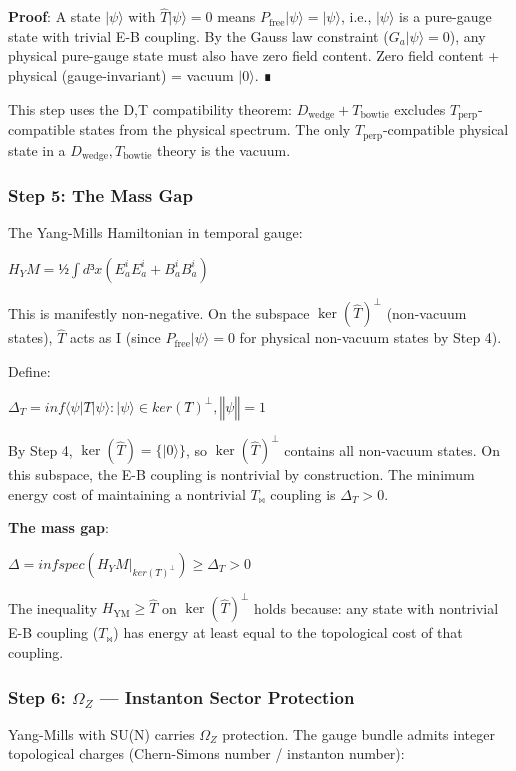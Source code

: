 \documentclass[12pt,a4paper]{article}
\begin{document}
\textbf{Proof}: A state $|\psi\rangle$ with $\hat{T}|\psi\rangle = 0$ means $P_{\text{free}}|\psi\rangle = |\psi\rangle$, i.e., $|\psi\rangle$ is a pure-gauge state with trivial E-B coupling. By the Gauss law constraint ($G_a|\psi\rangle = 0$), any physical pure-gauge state must also have zero field content. Zero field content + physical (gauge-invariant) = vacuum $|0\rangle$. ∎

This step uses the D,T compatibility theorem: $D_{\text{wedge}} + T_{\text{bowtie}}$ excludes $T_{\text{perp}}$-compatible states from the physical spectrum. The only $T_{\text{perp}}$-compatible physical state in a $D_{\text{wedge}}, T_{\text{bowtie}}$ theory is the vacuum.

\subsubsection{Step 5: The Mass Gap}

The Yang-Mills Hamiltonian in temporal gauge:

$H_YM  =  ½ \int d³x (E_a^i E_a^i + B_a^i B_a^i)$

This is manifestly non-negative. On the subspace $\ker(\hat{T})^\perp$ (non-vacuum states), $\hat{T}$ acts as I (since $P_{\text{free}}|\psi\rangle = 0$ for physical non-vacuum states by Step 4).

Define:

$\Delta_T  =  inf { \langle\psi|T̂|\psi\rangle : |\psi\rangle \in ker(T̂)^\perp, ‖\psi‖ = 1 }$

By Step 4, $\ker(\hat{T}) = \{|0\rangle\}$, so $\ker(\hat{T})^\perp$ contains all non-vacuum states. On this subspace, the E-B coupling is nontrivial by construction. The minimum energy cost of maintaining a nontrivial $T_{\bowtie}$ coupling is $\Delta_T > 0$.

\textbf{The mass gap}:

$\Delta  =  inf spec(H_YM|_{ker(T̂)^\perp})  \geq  \Delta_T  >  0$

The inequality $H_{\text{YM}} \ge \hat{T}$ on $\ker(\hat{T})^\perp$ holds because: any state with nontrivial E-B coupling ($T_{\bowtie}$) has energy at least equal to the topological cost of that coupling.

\subsubsection{Step 6: $\Omega_Z$ --- Instanton Sector Protection}

Yang-Mills with SU(N) carries $\Omega_Z$ protection. The gauge bundle admits integer topological charges (Chern-Simons number / instanton number):
\end{document}
